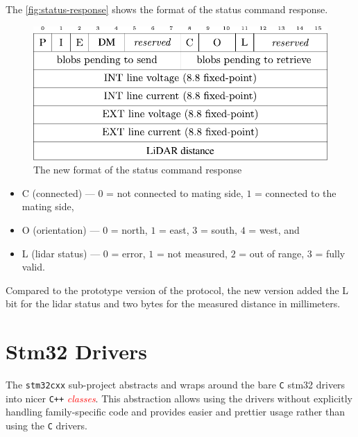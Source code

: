 \documentclass[
  digital,     %
  oneside,     %
  nosansbold,  %
  nocolorbold, %
  nolof,         %
  nolot,         %
]{fithesis4}
\newcommand{\TODO}[1]{\textcolor{red}{\textit{#1}}}
\newcommand{\TODOLIST}[1]{}
\begin{document}
{{{The \autoref{fig:status-response} shows the format of the status command response.

\begin{figure}
    \includegraphics[width=\textwidth,height=\textheight,keepaspectratio]{assets/status_response_new.pdf}
    \caption[Status command response]{The new format of the status command response}
    \label{fig:status-response}
\end{figure}

\begin{itemize}
    \item C (connected) --- $0$ = not connected to mating side, $1$ = connected to the mating side,
    \item O (orientation) --- $0$ = north, $1$ = east, $3$ = south, $4$ = west, and
    \item L (\acrshort{lidar} status) --- $0$ = error, $1$ = not measured, $2$ = out of range, $3$ = fully valid.
\end{itemize}

Compared to the prototype version of the protocol, the new version added the L bit for the \acrshort{lidar} status and two bytes for the measured distance in millimeters.

\section{ Stm32 Drivers }
\TODOLIST{
\begin{itemize}
    \item already implemented
    \item port files --- portability
    \item to implement --- \acrshort{i2c}
\end{itemize}
}

The \lstinline|stm32cxx| sub-project abstracts and wraps around the bare 
\verb|C| stm32 drivers into nicer \verb|C++| \TODO{classes}. This abstraction allows using the drivers without explicitly handling family-specific code and provides easier and prettier usage rather than using the \verb|C| drivers.

}}}
\end{document}
